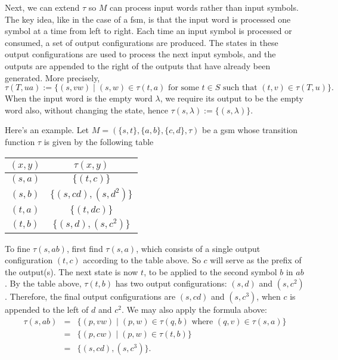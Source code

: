\documentclass[12pt]{article}
\begin{document}
Next, we can extend $\tau$ so $M$ can process input words rather than input symbols.  The key idea, like in the case of a fsm, is that the input word is processed one symbol at a time from left to right.  Each time an input symbol is processed or consumed, a set of output configurations are produced.  The states in these output configurations are used to process the next input symbols, and the outputs are appended to the right of the outputs that have already been generated.  More precisely,
$$\tau(T,ua):= \lbrace (s,vw) \mid (s,w)\in \tau(t,a)\mbox{ for some }t\in S\mbox{ such that }(t,v)\in \tau(T,u) \rbrace.$$
When the input word is the empty word $\lambda$, we require its output to be the empty word also, without changing the state, hence $\tau(s,\lambda):=\lbrace (s,\lambda)\rbrace$.

Here's an example.  Let $M=(\lbrace s,t\rbrace, \lbrace a,b\rbrace,\lbrace c,d\rbrace, \tau)$ be a gsm whose transition function $\tau$ is given by the following table
\begin{center}
\begin{tabular}{|c|c|}
\hline
$(x,y)$ & $\tau(x,y)$ \\
\hline\hline
$(s,a)$ & $\lbrace (t,c) \rbrace$ \\
\hline
$(s,b)$ & $\lbrace (s,cd), (s,d^2) \rbrace$ \\
\hline
$(t,a)$ & $\lbrace (t,dc) \rbrace$ \\
\hline
$(t,b)$ & $\lbrace (s,d), (s,c^2) \rbrace$ \\
\hline
\end{tabular}
\end{center}
To fine $\tau(s,ab)$, first find $\tau(s,a)$, which consists of a single output configuration $(t,c)$ according to the table above.  So $c$ will serve as the prefix of the output(s).  The next state is now $t$, to be applied to the second symbol $b$ in $ab$.  By the table above, $\tau(t,b)$ has two output configurations: $(s,d)$ and $(s,c^2)$.  Therefore, the final output configurations are $(s,cd)$ and $(s,c^3)$, when $c$ is appended to the left of $d$ and $c^2$.  We may also apply the formula above:
\begin{eqnarray*}
\tau(s,ab) &=& \lbrace (p,vw) \mid (p,w) \in \tau(q,b) \mbox{ where }(q,v)\in \tau(s,a)\rbrace \\ &=& \lbrace (p,cw) \mid (p,w) \in \tau(t,b) \rbrace \\ &=& \lbrace (s,cd),(s,c^3)\rbrace.
\end{eqnarray*}
\end{document}
